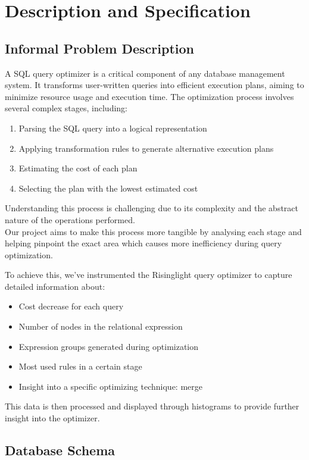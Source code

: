 \documentclass[a4paper,12pt]{scrreprt}
\begin{document}
\chapter{Description and Specification}\label{chap:analiseEspecificacao}
\thispagestyle{fancy}
\section{Informal Problem Description}\label{sec:descricaoProblema}

A SQL query optimizer is a critical component of any database management system. It transforms user-written queries into efficient execution plans, aiming to minimize resource usage and execution time. The optimization process involves several complex stages, including:
\begin{enumerate}
    \item Parsing the SQL query into a logical representation
    \item Applying transformation rules to generate alternative execution plans
    \item Estimating the cost of each plan
    \item Selecting the plan with the lowest estimated cost
\end{enumerate}

Understanding this process is challenging due to its complexity and the abstract nature of the operations performed. \\
Our project aims to make this process more tangible by analysing each stage and helping pinpoint the exact area which causes more inefficiency during query optimization.

To achieve this, we've instrumented the Risinglight query optimizer to capture detailed information about:
\begin{itemize}
    \item Cost decrease for each query
    \item Number of nodes in the relational expression
    \item Expression groups generated during optimization
    \item Most used rules in a certain stage
    \item Insight into a specific optimizing technique: merge
\end{itemize}

This data is then processed and displayed through histograms to provide further insight into the optimizer.

\section{Database Schema}
\end{document}
